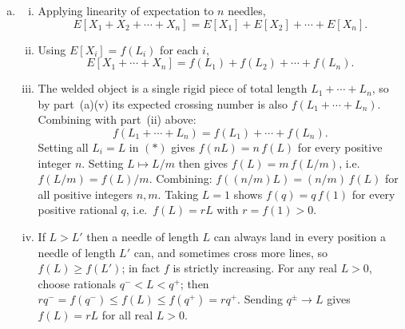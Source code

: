 \documentclass[12pt]{article}
\begin{document}
\begin{enumerate}[(a)]
\begin{enumerate}[(i)]
    \item When the two needles are thrown
    separately, the position and orientation of each needle are chosen
    independently of the other. Therefore the events involving the first
    needle are independent of those involving the second, so $X_1$ and
    $X_2$ are independent.

    \item After welding, the total number of crossings of the combined
    object is $X_1 + X_2$ (each needle still contributes its own
    crossings). By linearity of expectation,
    \[
      E[X_1 + X_2] = E[X_1] + E[X_2].
    \]

    \item By part~(a)(v), $E[X_1] = f(L_1)$ and $E[X_2] = f(L_2)$, so
    \[
      E[X_1 + X_2] = f(L_1) + f(L_2).
    \]

  \end{enumerate}

  \item

  \begin{enumerate}[(i)]

    \item Applying linearity of expectation to $n$ needles,
    \[
      E[X_1 + X_2 + \cdots + X_n] = E[X_1] + E[X_2] + \cdots + E[X_n].
    \]

    \item Using $E[X_i] = f(L_i)$ for each $i$,
    \[
      E[X_1 + \cdots + X_n] = f(L_1) + f(L_2) + \cdots + f(L_n).
    \]

    \item The welded object is a single rigid piece of total length
    $L_1 + \cdots + L_n$, so by part~(a)(v) its expected crossing number
    is also $f(L_1 + \cdots + L_n)$.  Combining with part~(ii) above:
    \[
      f(L_1 + \cdots + L_n) = f(L_1) + \cdots + f(L_n). \tag{$*$}
    \]
    Setting all $L_i = L$ in $(*)$ gives $f(nL) = n\,f(L)$ for every
    positive integer $n$.  Setting $L \mapsto L/m$ then gives
    $f(L) = m\,f(L/m)$, i.e.\ $f(L/m) = f(L)/m$.  Combining:
    $f((n/m)L) = (n/m)\,f(L)$ for all positive integers $n, m$.
    Taking $L = 1$ shows $f(q) = q\,f(1)$ for every positive rational
    $q$, i.e.\ $f(L) = rL$ with $r = f(1) > 0$.

    \item If $L > L'$ then a needle of length $L$ can always land in
    every position a needle of length $L'$ can, and sometimes cross more
    lines, so $f(L) \geq f(L') $; in fact $f$ is strictly increasing.
    For any real $L > 0$, choose rationals $q^- < L < q^+$; then
    $rq^- = f(q^-) \leq f(L) \leq f(q^+) = rq^+$.  Sending $q^\pm \to L$
    gives $f(L) = rL$ for all real $L > 0$.


\end{enumerate}
\end{enumerate}
\end{document}
